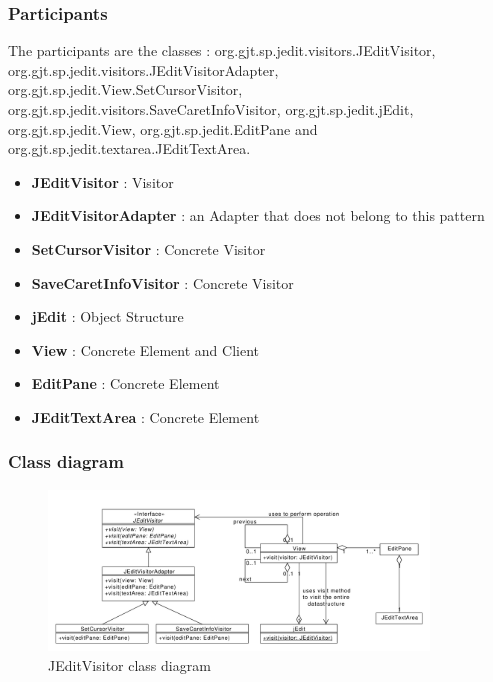 \documentclass[a4paper,10pt]{article}
\begin{document}
\subsubsection[Participants]{Participants\footnotemark[1]}
The participants are the classes : org.gjt.sp.jedit.visitors.JEditVisitor, org.gjt.sp.jedit.visitors.JEditVisitorAdapter, org.gjt.sp.jedit.View.SetCursorVisitor, org.gjt.sp.jedit.visitors.SaveCaretInfoVisitor, org.gjt.sp.jedit.jEdit, org.gjt.sp.jedit.View, org.gjt.sp.jedit.EditPane and org.gjt.sp.jedit.textarea.JEditTextArea.
\begin{itemize}
 \item \textbf{JEditVisitor} : Visitor
 \item \textbf{JEditVisitorAdapter} : an Adapter that does not belong to this pattern
 \item \textbf{SetCursorVisitor} : Concrete Visitor
 \item \textbf{SaveCaretInfoVisitor} : Concrete Visitor
 \item \textbf{jEdit} : Object Structure
 \item \textbf{View} : Concrete Element and Client
 \item \textbf{EditPane} : Concrete Element
 \item \textbf{JEditTextArea} : Concrete Element
\end{itemize}

\subsubsection{Class diagram}
\begin{center}
\begin{figure}[h]
  \centerline{\includegraphics[width=0.9\textwidth]{visitor-jeditvisitor-class-diagram.pdf}}
  \caption{JEditVisitor class diagram}
\end{figure}
\end{center}
\end{document}
